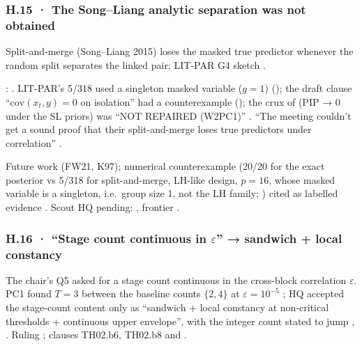 \subsubsection*{H.15 · The Song--Liang analytic separation was not obtained}
\begin{description}[leftmargin=1.3em,style=unboxed,font=\normalfont]
\item[\textbf{Claim.}] Split-and-merge (Song--Liang 2015) loses the masked true predictor whenever the random split separates the linked pair; LIT-PAR G4 sketch .
\item[\textbf{Failed.}] : . LIT-PAR's 5/318 used a singleton masked variable ($g=1$) (); the draft clause ``$\mathrm{cov}(x_t,y)=0$ on isolation'' had a counterexample (); the crux of  (PIP → 0 under the SL priors) was ``NOT REPAIRED (W2PC1)'' . ``The meeting couldn't get a sound proof that their split-and-merge loses true predictors under correlation'' .
\item[\textbf{Current state.}] Future work  (FW21, K97); numerical counterexample  (20/20 for the exact posterior vs 5/318 for split-and-merge, LH-like design, $p=16$, whose masked variable is a singleton, i.e.\ group size 1, not the LH family; ) cited as labelled evidence  . Scout HQ pending: , frontier .
\end{description}

\subsubsection*{H.16 · ``Stage count continuous in $\varepsilon$'' → sandwich + local constancy}
The chair's Q5 asked for a stage count continuous in the cross-block correlation $\varepsilon$. PC1 found $T=3$ between the baseline counts $\{2,4\}$ at $\varepsilon=10^{-5}$ ; HQ accepted the stage-count content only as ``sandwich + local constancy at non-critical thresholds + continuous upper envelope'', with the integer count stated to jump , . Ruling ; clauses TH02.b6, TH02.b8 and .

